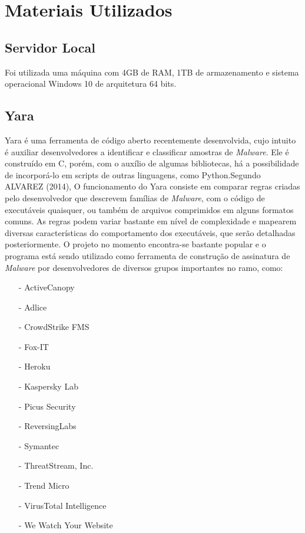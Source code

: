 \section{Materiais Utilizados}
\label{l.material}

\subsection{Servidor Local} %
\label{sub:servidor}

Foi utilizada uma máquina com 4GB de RAM, 1TB de armazenamento e sistema operacional Windows 10 de arquitetura 64 bits.

\subsection{Yara}
\label{sub:Yara}

Yara é uma ferramenta de código aberto recentemente desenvolvida, cujo intuito é auxiliar desenvolvedores a identificar e classificar amostras de \textit{Malware}. Ele é construído em C, porém, com o auxílio de algumas bibliotecas, há a possibilidade de incorporá-lo em scripts de outras linguagens, como Python.Segundo ALVAREZ (2014), O funcionamento do Yara consiste em comparar regras criadas pelo desenvolvedor que descrevem famílias de \textit{Malware}, com o código de executáveis quaisquer, ou também de arquivos comprimidos em alguns formatos comuns. As regras podem variar bastante em nível de complexidade e mapearem diversas características do comportamento dos executáveis, que serão detalhadas posteriormente. O projeto no momento encontra-se bastante popular e o programa está sendo utilizado como ferramenta de construção de assinatura de \textit{Malware} por desenvolvedores de diversos grupos importantes no ramo, como:
\begin{itemize}
	\item[-] ActiveCanopy
	\item[-] Adlice
	\item[-] CrowdStrike FMS
	\item[-] Fox-IT
	\item[-] Heroku
	\item[-] Kaspersky Lab
	\item[-] Picus Security
	\item[-] ReversingLabs
	\item[-] Symantec
	\item[-] ThreatStream, Inc.
	\item[-] Trend Micro
	\item[-] VirusTotal Intelligence
	\item[-] We Watch Your Website
\end{itemize}

